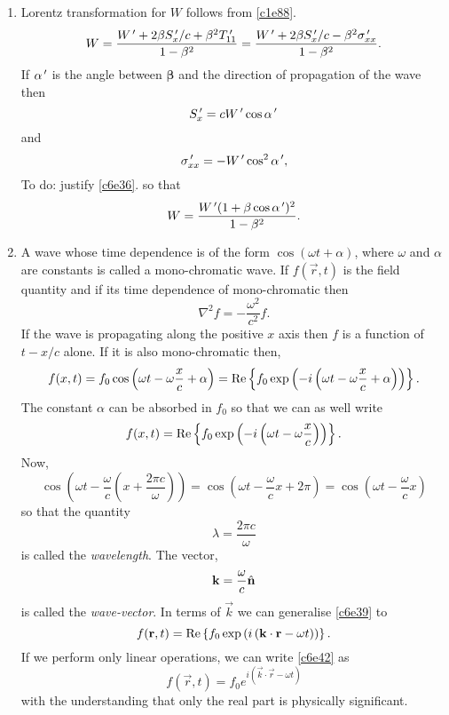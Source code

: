 \begin{enumerate}
\item Lorentz transformation for $W$ follows from \eqref{c1e88}.
\begin{equation}\label{c6e35}
W = \frac{W^{\,\prime} + 2\beta S^{\,\prime}_x/c + \beta^2T_{11}^{\,\prime}}{1 - \beta^2}
 = \frac{W^{\,\prime} + 2\beta S^{\,\prime}_x/c - \beta^2\sigma_{xx}^{\,\prime}}{1 - \beta^2}.
\end{equation}
If $\alpha^{\,\prime}$ is the angle between $\bm{\beta}$ and the direction of 
propagation of the wave then
\[
S_x^{\,\prime} = cW^{\,\prime}\cos\alpha^{\,\prime}
\]
and 
\begin{equation}\label{c6e36}
\sigma_{xx}^{\,\prime} = -W^{\,\prime}\cos^2\alpha^{\,\prime},
\end{equation}
{\color{red}To do: justify \eqref{c6e36}.} so that
\begin{equation}\label{c6e37}
W = \frac{W^{\,\prime}(1 + \beta\cos\alpha^{\,\prime})^2}{1 - \beta^2}.
\end{equation}

\item A wave whose time dependence is of the form $\cos(\omega t + \alpha)$, where
$\omega$ and $\alpha$ are constants is called a mono-chromatic wave. If $f(\vec{r},
t)$ is the field quantity and if its time dependence of mono-chromatic then
\begin{equation}\label{c6e38}
\nabla^2 f = -\frac{\omega^2}{c^2} f.
\end{equation}
If the wave is propagating along the positive $x$ axis then $f$ is a function of
$t - x/c$ alone. If it is also mono-chromatic then,
\[
f(x, t) = f_0\cos\left(\omega t - \omega\frac{x}{c} + \alpha\right) = 
\operatorname{Re}\left\{f_0\exp\left(-i\left(\omega t - \omega\frac{x}{c} + \alpha\right)\right)\right\}.
\]
The constant $\alpha$ can be absorbed in $f_0$ so that we can as well write
\begin{equation}\label{c6e39}
f(x, t) = \operatorname{Re}\left\{f_0\exp\left(-i\left(\omega t - \omega\frac{x}{c}\right)\right)\right\}.
\end{equation}
Now,
\[
\cos\left(\omega t - \frac{\omega}{c}\left(x + \frac{2\pi c}{\omega}\right)\right)
= \cos\left(\omega t - \frac{\omega}{c}x + 2\pi\right) = 
\cos\left(\omega t - \frac{\omega}{c}x\right)
\]
so that the quantity
\begin{equation}\label{c6e40}
\lambda = \frac{2\pi c}{\omega}
\end{equation}
is called the \emph{wavelength}. The vector,
\begin{equation}\label{c6e41}
\mathbf{k} = \frac{\omega}{c}\hat{\mathbf{n}}
\end{equation}
is called the \emph{wave-vector}. In terms of $\vec{k}$ we can generalise 
\eqref{c6e39} to
\begin{equation}\label{c6e42}
f(\mathbf{r}, t) = \operatorname{Re}\left\{f_0\exp\left(i\left(\mathbf{k}\cdot\mathbf{r} - \omega t\right)\right)\right\}.
\end{equation}
If we perform only linear operations, we can write \eqref{c6e42} as
\begin{equation}\label{c6e43}
f(\vec{r}, t) = f_0e^{i(\vec{k}\cdot\vec{r} - \omega t)}
\end{equation}
with the understanding that only the real part is physically significant.


\end{enumerate}
